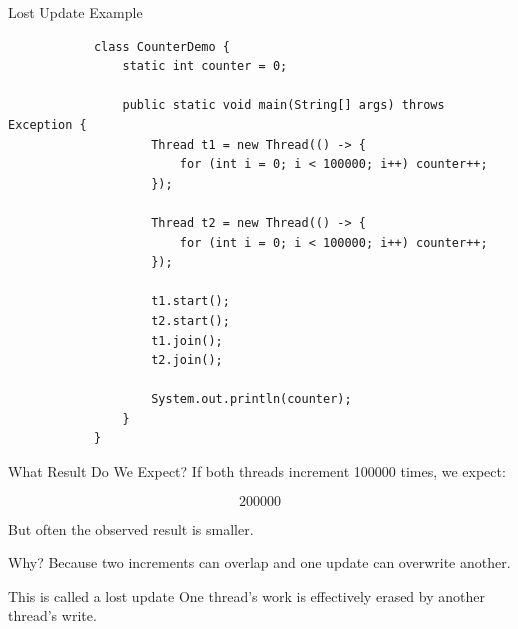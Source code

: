 \documentclass[aspectratio=169,11pt]{beamer}
\begin{document}
	\begin{frame}[fragile]{Lost Update Example}
		\begin{lstlisting}
			class CounterDemo {
				static int counter = 0;
				
				public static void main(String[] args) throws Exception {
					Thread t1 = new Thread(() -> {
						for (int i = 0; i < 100000; i++) counter++;
					});
					
					Thread t2 = new Thread(() -> {
						for (int i = 0; i < 100000; i++) counter++;
					});
					
					t1.start();
					t2.start();
					t1.join();
					t2.join();
					
					System.out.println(counter);
				}
			}
		\end{lstlisting}
	\end{frame}
	
	\begin{frame}{What Result Do We Expect?}
		If both threads increment 100000 times, we expect:
		
		\[
		200000
		\]
		
		\vspace{0.35cm}
		
		But often the observed result is smaller.
		
		\vspace{0.35cm}
		
		\begin{alertblock}{Why?}
			Because two increments can overlap and one update can overwrite another.
		\end{alertblock}
		
		\vspace{0.25cm}
		
		\begin{exampleblock}{This is called a lost update}
			One thread's work is effectively erased by another thread's write.
		\end{exampleblock}
	\end{frame}
	
\end{document}
